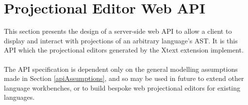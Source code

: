 \documentclass{article}
\begin{document}
\clearpage
\section{Projectional Editor Web API}\label{api}
This section presents the design of a server-side web API to allow a client to display and interact with projections of an arbitrary language's AST. It is this API which the projectional editors generated by the Xtext extension implement. 
\\
\\
The API specification is dependent only on the general modelling assumptions made in Section \ref{apiAssumptions}, and so may be used in future to extend other language workbenches, or to build bespoke web projectional editors for existing languages.
\end{document}
